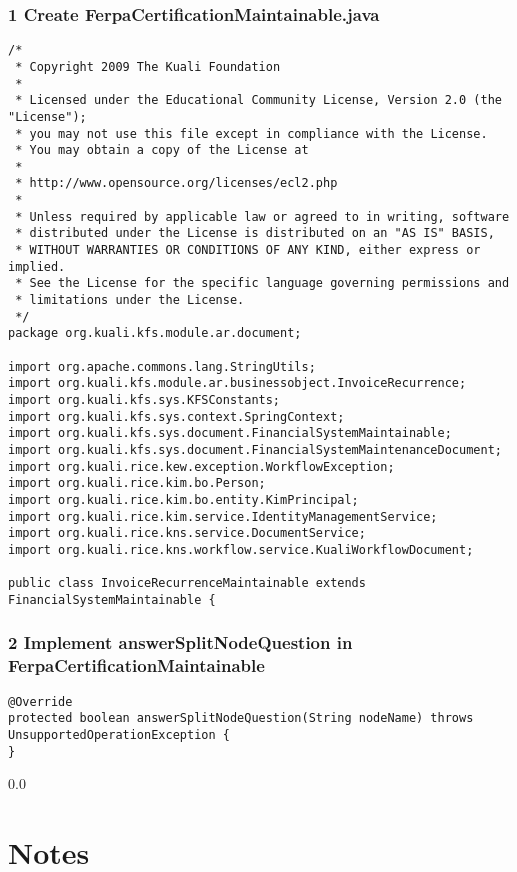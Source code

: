 \subsubsection*{1 Create FerpaCertificationMaintainable.java}
\begin{verbatim}
/*
 * Copyright 2009 The Kuali Foundation
 * 
 * Licensed under the Educational Community License, Version 2.0 (the "License");
 * you may not use this file except in compliance with the License.
 * You may obtain a copy of the License at
 * 
 * http://www.opensource.org/licenses/ecl2.php
 * 
 * Unless required by applicable law or agreed to in writing, software
 * distributed under the License is distributed on an "AS IS" BASIS,
 * WITHOUT WARRANTIES OR CONDITIONS OF ANY KIND, either express or implied.
 * See the License for the specific language governing permissions and
 * limitations under the License.
 */
package org.kuali.kfs.module.ar.document;

import org.apache.commons.lang.StringUtils;
import org.kuali.kfs.module.ar.businessobject.InvoiceRecurrence;
import org.kuali.kfs.sys.KFSConstants;
import org.kuali.kfs.sys.context.SpringContext;
import org.kuali.kfs.sys.document.FinancialSystemMaintainable;
import org.kuali.kfs.sys.document.FinancialSystemMaintenanceDocument;
import org.kuali.rice.kew.exception.WorkflowException;
import org.kuali.rice.kim.bo.Person;
import org.kuali.rice.kim.bo.entity.KimPrincipal;
import org.kuali.rice.kim.service.IdentityManagementService;
import org.kuali.rice.kns.service.DocumentService;
import org.kuali.rice.kns.workflow.service.KualiWorkflowDocument;

public class InvoiceRecurrenceMaintainable extends FinancialSystemMaintainable {

\end{verbatim}

\subsubsection*{2 Implement answerSplitNodeQuestion in FerpaCertificationMaintainable}

\begin{verbatim}
@Override
protected boolean answerSplitNodeQuestion(String nodeName) throws UnsupportedOperationException {
}    
\end{verbatim}

\newpage
{\setlength{\baselineskip}%
  {0.0\baselineskip}
  \section*{Notes}
  \hrulefill \par}